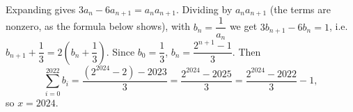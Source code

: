 Expanding gives $3a_n-6a_{n+1}=a_na_{n+1}$. Dividing by $a_na_{n+1}$ (the terms are nonzero, as the formula below shows), with $b_n=\dfrac1{a_n}$ we get $3b_{n+1}-6b_n=1$, i.e. $b_{n+1}+\dfrac13=2\left(b_n+\dfrac13\right)$. Since $b_0=\dfrac13$, $b_n=\dfrac{2^{n+1}-1}3$. Then
\[\sum_{i=0}^{2022}b_i=\dfrac{(2^{2024}-2)-2023}3=\dfrac{2^{2024}-2025}3=\dfrac{2^{2024}-2022}3-1,\]
so $x=\boxed{2024}$.
